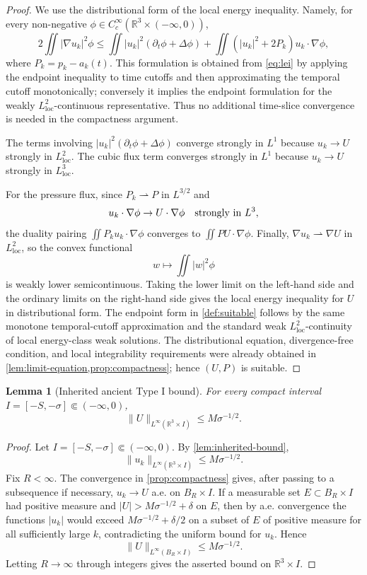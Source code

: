 \documentclass[11pt]{amsart}
\theoremstyle{plain}
\newtheorem{lemma}[theorem]{Lemma}
\theoremstyle{definition}
\theoremstyle{remark}
\numberwithin{equation}{section}
\newcommand{\R}{\mathbb R}
\newcommand{\loc}{\mathrm{loc}}
\begin{document}
\begin{proof}
We use the distributional form of the local energy inequality.  Namely, for
every non-negative \(\phi\in C_c^\infty(\R^3\times(-\infty,0))\),
\[
   2\iint |\nabla u_k|^2\phi
   \le
   \iint |u_k|^2(\partial_t\phi+\Delta\phi)
   +\iint (|u_k|^2+2P_k)u_k\cdot\nabla\phi ,
\]
where \(P_k=p_k-a_k(t)\).  This formulation is obtained from
\eqref{eq:lei} by applying the endpoint inequality to time cutoffs and then
approximating the temporal cutoff monotonically; conversely it implies the
endpoint formulation for the weakly \(L^2_{\loc}\)-continuous representative.
Thus no additional time-slice convergence is needed in the compactness
argument.

The terms involving \(|u_k|^2(\partial_t\phi+\Delta\phi)\) converge strongly
in \(L^1\) because \(u_k\to U\) strongly in \(L^2_{\loc}\).  The cubic flux
term converges strongly in \(L^1\) because \(u_k\to U\) strongly in
\(L^3_{\loc}\).

For the pressure flux, since \(P_k\rightharpoonup P\) in \(L^{3/2}\) and
\[
   u_k\cdot\nabla\phi\to U\cdot\nabla\phi
   \quad\hbox{strongly in }L^3,
\]
the duality pairing
\(\iint P_k u_k\cdot\nabla\phi\) converges to
\(\iint P U\cdot\nabla\phi\).  Finally,
\(\nabla u_k\rightharpoonup\nabla U\) in \(L^2_{\loc}\), so the convex
functional
\[
   w\mapsto \iint |w|^2\phi
\]
is weakly lower semicontinuous.  Taking the lower limit on the left-hand side
and the ordinary limits on the right-hand side gives the local energy
inequality for \(U\) in distributional form.  The endpoint form in
\cref{def:suitable} follows by the same monotone temporal-cutoff
approximation and the standard weak \(L^2_{\loc}\)-continuity of local
energy-class weak solutions.  The distributional equation, divergence-free
condition, and local integrability requirements were already obtained in
\cref{lem:limit-equation,prop:compactness}; hence \((U,P)\) is suitable.
\end{proof}

\begin{lemma}[Inherited ancient Type I bound]\label{lem:limit-bound}
For every compact interval \(I=[-S,-\sigma]\Subset(-\infty,0)\),
\[
   \|U\|_{L^\infty(\R^3\times I)}
   \le M\sigma^{-1/2}.
\]
\end{lemma}

\begin{proof}
Let \(I=[-S,-\sigma]\Subset(-\infty,0)\).  By
\cref{lem:inherited-bound},
\[
   \|u_k\|_{L^\infty(\R^3\times I)}
   \le M\sigma^{-1/2}.
\]
Fix \(R<\infty\).  The convergence in \cref{prop:compactness} gives, after
passing to a subsequence if necessary, \(u_k\to U\) a.e. on \(B_R\times I\).
If a measurable set \(E\subset B_R\times I\) had positive measure and
\(|U|>M\sigma^{-1/2}+\delta\) on \(E\), then by a.e. convergence the functions
\(|u_k|\) would exceed \(M\sigma^{-1/2}+\delta/2\) on a subset of \(E\) of
positive measure for all sufficiently large \(k\), contradicting the uniform
bound for \(u_k\).  Hence
\[
   \|U\|_{L^\infty(B_R\times I)}\le M\sigma^{-1/2}.
\]
Letting \(R\to\infty\) through integers gives the asserted bound on
\(\R^3\times I\).
\end{proof}
\end{document}
